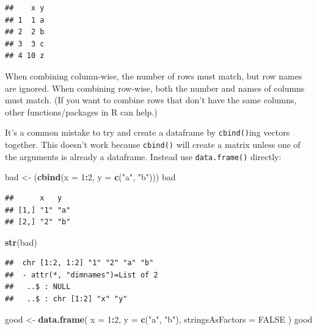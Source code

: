 \documentclass[
]{book}
\newenvironment{Shaded}{\begin{snugshade}}{\end{snugshade}}
\newcommand{\AttributeTok}[1]{\textcolor[rgb]{0.13,0.29,0.53}{#1}}
\newcommand{\ConstantTok}[1]{\textcolor[rgb]{0.56,0.35,0.01}{#1}}
\newcommand{\DecValTok}[1]{\textcolor[rgb]{0.00,0.00,0.81}{#1}}
\newcommand{\FunctionTok}[1]{\textcolor[rgb]{0.13,0.29,0.53}{\textbf{#1}}}
\newcommand{\NormalTok}[1]{#1}
\newcommand{\OtherTok}[1]{\textcolor[rgb]{0.56,0.35,0.01}{#1}}
\newcommand{\SpecialCharTok}[1]{\textcolor[rgb]{0.81,0.36,0.00}{\textbf{#1}}}
\newcommand{\StringTok}[1]{\textcolor[rgb]{0.31,0.60,0.02}{#1}}
\begin{document}
\begin{verbatim}
##    x y
## 1  1 a
## 2  2 b
## 3  3 c
## 4 10 z
\end{verbatim}

When combining column-wise, the number of rows must match, but row names are ignored. When combining row-wise, both the number and names of columns must match. (If you want to combine rows that don't have the same columns, other functions/packages in R can help.)

It's a common mistake to try and create a dataframe by \texttt{cbind()}ing vectors together. This doesn't work because \texttt{cbind()} will create a matrix unless one of the arguments is already a dataframe. Instead use \texttt{data.frame()} directly:

\begin{Shaded}
\begin{Highlighting}[]
\NormalTok{bad }\OtherTok{\textless{}{-}}\NormalTok{ (}\FunctionTok{cbind}\NormalTok{(}\AttributeTok{x =} \DecValTok{1}\SpecialCharTok{:}\DecValTok{2}\NormalTok{, }\AttributeTok{y =} \FunctionTok{c}\NormalTok{(}\StringTok{"a"}\NormalTok{, }\StringTok{"b"}\NormalTok{)))}
\NormalTok{bad}
\end{Highlighting}
\end{Shaded}

\begin{verbatim}
##      x   y  
## [1,] "1" "a"
## [2,] "2" "b"
\end{verbatim}

\begin{Shaded}
\begin{Highlighting}[]
\FunctionTok{str}\NormalTok{(bad)}
\end{Highlighting}
\end{Shaded}

\begin{verbatim}
##  chr [1:2, 1:2] "1" "2" "a" "b"
##  - attr(*, "dimnames")=List of 2
##   ..$ : NULL
##   ..$ : chr [1:2] "x" "y"
\end{verbatim}

\begin{Shaded}
\begin{Highlighting}[]
\NormalTok{good }\OtherTok{\textless{}{-}} \FunctionTok{data.frame}\NormalTok{(}
  \AttributeTok{x =} \DecValTok{1}\SpecialCharTok{:}\DecValTok{2}\NormalTok{, }\AttributeTok{y =} \FunctionTok{c}\NormalTok{(}\StringTok{"a"}\NormalTok{, }\StringTok{"b"}\NormalTok{),}
  \AttributeTok{stringsAsFactors =} \ConstantTok{FALSE}
\NormalTok{)}
\NormalTok{good}
\end{Highlighting}
\end{Shaded}
\end{document}
